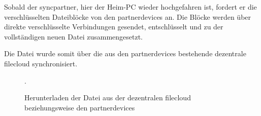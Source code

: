 Sobald der \gls{syncpartner}, hier der Heim-PC wieder hochgefahren ist, fordert er die
verschlüsselten Dateiblöcke von den \glspl{partnerdevice} an. Die Blöcke werden über
direkte verschlüsselte Verbindungen gesendet, entschlüsselt und zu der
vollständigen neuen Datei zusammengesetzt.

Die Datei wurde somit über die aus den \glspl{partnerdevice} bestehende dezentrale
\gls{filecloud} synchronisiert.

\begin{figure}[h]
	\centering
  
  \caption{Herunterladen der Datei aus der dezentralen \gls{filecloud} beziehungsweise
	den \glspl{partnerdevice}}.
\end{figure}
